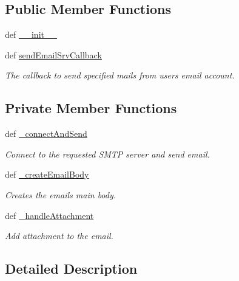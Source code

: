 \subsection*{Public Member Functions}
\begin{DoxyCompactItemize}
\item 
def \hyperlink{classrapp__email_1_1email__sender_1_1EmailSender_a14412649b41a6226d1732e5c8c598028}{\-\_\-\-\_\-init\-\_\-\-\_\-}
\item 
def \hyperlink{classrapp__email_1_1email__sender_1_1EmailSender_a45f55e0f4898f0a587d33822967250af}{send\-Email\-Srv\-Callback}
\begin{DoxyCompactList}\small\item\em The callback to send specified mails from users email account. \end{DoxyCompactList}\end{DoxyCompactItemize}
\subsection*{Private Member Functions}
\begin{DoxyCompactItemize}
\item 
def \hyperlink{classrapp__email_1_1email__sender_1_1EmailSender_a4726903f599d1b63689c7dd999011efa}{\-\_\-connect\-And\-Send}
\begin{DoxyCompactList}\small\item\em Connect to the requested S\-M\-T\-P server and send email. \end{DoxyCompactList}\item 
def \hyperlink{classrapp__email_1_1email__sender_1_1EmailSender_a243a7a9c33108f87a886670ada6f91ad}{\-\_\-create\-Email\-Body}
\begin{DoxyCompactList}\small\item\em Creates the emails main body. \end{DoxyCompactList}\item 
def \hyperlink{classrapp__email_1_1email__sender_1_1EmailSender_ab4dcd219814fa425832f5d63707fa8a6}{\-\_\-handle\-Attachment}
\begin{DoxyCompactList}\small\item\em Add attachment to the email. \end{DoxyCompactList}\end{DoxyCompactItemize}


\subsection{Detailed Description}


